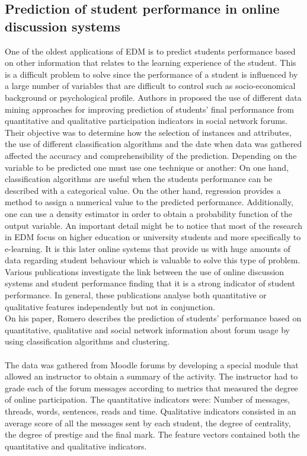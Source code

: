 \documentclass[11pt, oneside]{article}   	%
\begin{document}
\subsection{Prediction of student performance in online discussion systems}
One of the oldest applications of EDM is to predict students performance based on other information that relates to the learning experience of the student. This is a difficult problem to solve since the performance of a student is influenced by a large number of variables that are difficult to control such as socio-economical background or psychological profile. Authors in \cite{Romero2013} proposed the use of different data mining approaches for improving prediction of students' final performance from quantitative and qualitative participation indicators in social network forums. Their objective was to determine how the selection of instances and attributes, the use of different classification algorithms and the date when data was gathered affected the accuracy and comprehensibility of the prediction. Depending on the variable to be predicted one must use one technique or another: On one hand, classification algorithms are useful when the students performance can be described with a categorical value. On the other hand, regression provides a method to assign a numerical value to the predicted performance. Additionally, one can use a density estimator in order to obtain a probability function of the output variable. An important detail might be to notice that most of the research in EDM focus on higher education or university students and more specifically to e-learning. It is this later online systems that provide us with huge amounts of data regarding student behaviour which is valuable to solve this type of problem. Various publications investigate the link between the use of online discussion systems and student performance finding that it is a strong indicator of student performance. In general, these publications analyse both quantitative or qualitative features independently but not in conjunction.\\ 
On his paper, Romero \cite{Romero2013} describes the prediction of students' performance based on quantitative, qualitative and social network information about forum usage by using classification algorithms and clustering.\\\\
The data was gathered from Moodle \cite{Moodle} forums by developing a special module that allowed an instructor to obtain a summary of the activity. The instructor had to grade each of the forum messages according to metrics that measured the degree of online participation. The quantitative indicators were: Number of messages, threads, words, sentences, reads and time. Qualitative indicators consisted in an average score of all the messages sent by each student, the degree of centrality, the degree of prestige and the final mark. The feature vectors contained both the quantitative and qualitative indicators.\\\\
\end{document}
